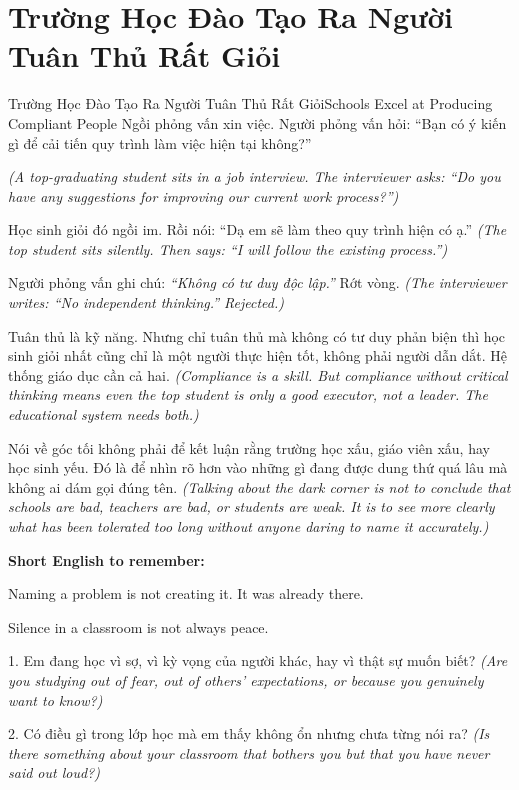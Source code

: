 \section{Trường Học Đào Tạo Ra Người Tuân Thủ Rất Giỏi}
\begin{truyen}{Trường Học Đào Tạo Ra Người Tuân Thủ Rất Giỏi}{Schools Excel at Producing Compliant People}
 Ngồi phỏng vấn xin việc. Người phỏng vấn hỏi: ``Bạn có ý kiến gì để cải tiến quy trình làm việc hiện tại không?''

\textit{(A top-graduating student sits in a job interview. The interviewer asks: ``Do you have any suggestions for improving our current work process?'')}

Học sinh giỏi đó ngồi im. Rồi nói: ``Dạ em sẽ làm theo quy trình hiện có ạ.''
\textit{(The top student sits silently. Then says: ``I will follow the existing process.'')}

Người phỏng vấn ghi chú: \textit{``Không có tư duy độc lập.''} Rớt vòng.
\textit{(The interviewer writes: ``No independent thinking.'' Rejected.)}

\begin{baihoc}
Tuân thủ là kỹ năng. Nhưng chỉ tuân thủ mà không có tư duy phản biện thì học sinh giỏi nhất cũng chỉ là một người thực hiện tốt, không phải người dẫn dắt. Hệ thống giáo dục cần cả hai.
\textit{(Compliance is a skill. But compliance without critical thinking means even the top student is only a good executor, not a leader. The educational system needs both.)}
\end{baihoc}
\end{truyen}

\begin{baihoc}
Nói về góc tối không phải để kết luận rằng trường học xấu, giáo viên xấu, hay học sinh yếu. Đó là để nhìn rõ hơn vào những gì đang được dung thứ quá lâu mà không ai dám gọi đúng tên.
\textit{(Talking about the dark corner is not to conclude that schools are bad, teachers are bad, or students are weak. It is to see more clearly what has been tolerated too long without anyone daring to name it accurately.)}
\end{baihoc}

\begin{ghinhoanh}
\textbf{Short English to remember:}

Naming a problem is not creating it. It was already there.

Silence in a classroom is not always peace.
\end{ghinhoanh}

\begin{tuhocnhanh}
1. Em đang học vì sợ, vì kỳ vọng của người khác, hay vì thật sự muốn biết? \textit{(Are you studying out of fear, out of others' expectations, or because you genuinely want to know?)}

2. Có điều gì trong lớp học mà em thấy không ổn nhưng chưa từng nói ra? \textit{(Is there something about your classroom that bothers you but that you have never said out loud?)}
\end{tuhocnhanh}

\ngancach
